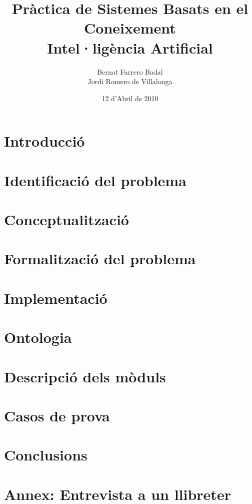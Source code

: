 \documentclass[a4paper]{report}
\author{Bernat Farrero Badal \\Jordi Romero de Villalonga}
\title{Pràctica de Sistemes Basats en el Coneixement \\ Intel·ligència Artificial}
\date{12 d'Abril de 2010}
\begin{document}
\maketitle

\tableofcontents

\newpage

\chapter{Introducció}


\chapter{Identificació del problema}


\chapter{Conceptualització}


\chapter{Formalització del problema}


\chapter{Implementació}


\chapter{Ontologia}


\chapter{Descripció dels mòduls}


\chapter{Casos de prova}


\chapter{Conclusions}


\chapter{Annex: Entrevista a un llibreter}

\end{document}
